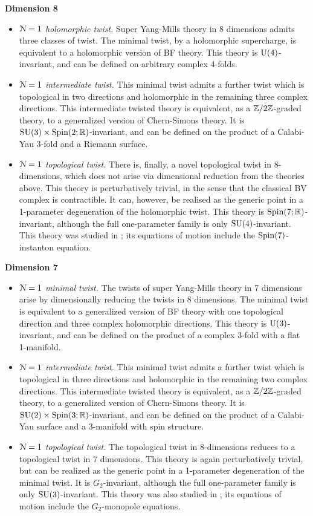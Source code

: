 \documentclass[10pt, oneside]{article}
\begin{document}
\textbf{Dimension 8}
\begin{itemize}
 \item \emph{$\mathcal{N}=1$ holomorphic twist.} Super Yang-Mills theory in 8 dimensions admits three classes of twist.  The minimal twist, by a holomorphic supercharge, is equivalent to a holomorphic version of BF theory.  This theory is $\mathrm{U}(4)$-invariant, and can be defined on arbitrary complex 4-folds.
 \item \emph{$\mathcal{N}=1$ intermediate twist.} This minimal twist admits a further twist which is topological in two directions and holomorphic in the remaining three complex directions.  This intermediate twisted theory is equivalent, as a $\mathbb Z/2\mathbb Z$-graded theory, to a generalized version of Chern-Simons theory.  It is $\mathrm{SU}(3) \times \mathrm{Spin}(2;\mathbb R)$-invariant, and can be defined on the product of a Calabi-Yau 3-fold and a Riemann surface.
 \item \emph{$\mathcal{N}=1$ topological twist.}  There is, finally, a novel topological twist in 8-dimensions, which does not arise via dimensional reduction from the theories above.  This theory is perturbatively trivial, in the sense that the classical BV complex is contractible.  It can, however, be realised as the generic point in a 1-parameter degeneration of the holomorphic twist.  This theory is $\mathrm{Spin}(7;\mathbb R)$-invariant, although the full one-parameter family is only $\mathrm{SU}(4)$-invariant.  This theory was studied in \cite{AcharyaOLoughlinSpence,BaulieuKannoSinger}; its equations of motion include the $\mathrm{Spin}(7)$-instanton equation.
\end{itemize}

\textbf{Dimension 7}
\begin{itemize}
 \item \emph{$\mathcal{N}=1$ minimal twist.} The twists of super Yang-Mills theory in 7 dimensions arise by dimensionally reducing the twists in 8 dimensions.  The minimal twist is equivalent to a generalized version of BF theory with one topological direction and three complex holomorphic directions.  This theory is $\mathrm{U}(3)$-invariant, and can be defined on the product of a complex 3-fold with a flat 1-manifold.
 \item \emph{$\mathcal{N}=1$ intermediate twist.} This minimal twist admits a further twist which is topological in three directions and holomorphic in the remaining two complex directions.  This intermediate twisted theory is equivalent, as a $\mathbb Z/2\mathbb Z$-graded theory, to a generalized version of Chern-Simons theory.  It is $\mathrm{SU}(2) \times \mathrm{Spin}(3;\mathbb R)$-invariant, and can be defined on the product of a Calabi-Yau surface and a 3-manifold with spin structure.
 \item \emph{$\mathcal{N}=1$ topological twist.} The topological twist in 8-dimensions reduces to a topological twist in 7 dimensions.  This theory is again perturbatively trivial, but can be realized as the generic point in a 1-parameter degeneration of the minimal twist.  It is $G_2$-invariant, although the full one-parameter family is only $\mathrm{SU}(3)$-invariant.  This theory was also studied in \cite{AcharyaOLoughlinSpence}; its equations of motion include the $G_2$-monopole equations.
\end{itemize}
\end{document}
